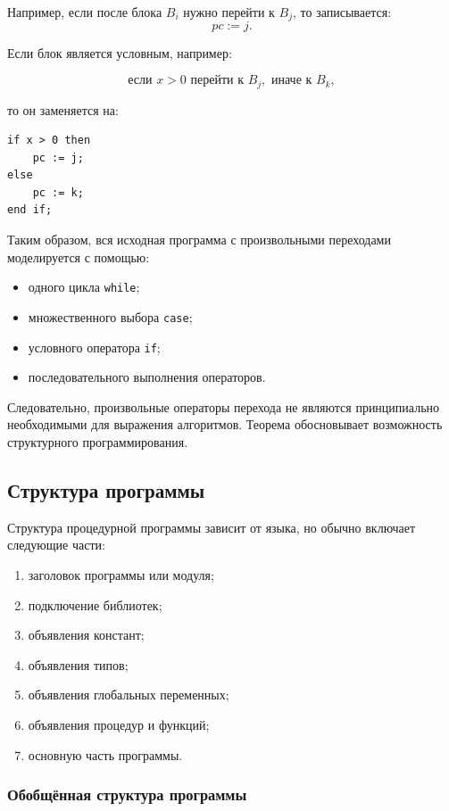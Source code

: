 \documentclass[12pt,a4paper]{article}
\begin{document}
Например, если после блока $B_i$ нужно перейти к $B_j$, то записывается:
\[
    pc := j.
\]

Если блок является условным, например:

\[
    \text{если } x > 0 \text{ перейти к } B_j, \text{ иначе к } B_k,
\]

то он заменяется на:

\begin{verbatim}
if x > 0 then
    pc := j;
else
    pc := k;
end if;
\end{verbatim}

Таким образом, вся исходная программа с произвольными переходами моделируется с помощью:
\begin{itemize}
    \item одного цикла \texttt{while};
    \item множественного выбора \texttt{case};
    \item условного оператора \texttt{if};
    \item последовательного выполнения операторов.
\end{itemize}

Следовательно, произвольные операторы перехода не являются принципиально необходимыми для выражения алгоритмов. Теорема обосновывает возможность структурного программирования.

\subsection{Структура программы}

Структура процедурной программы зависит от языка, но обычно включает следующие части:

\begin{enumerate}
    \item заголовок программы или модуля;
    \item подключение библиотек;
    \item объявления констант;
    \item объявления типов;
    \item объявления глобальных переменных;
    \item объявления процедур и функций;
    \item основную часть программы.
\end{enumerate}

\subsubsection{Обобщённая структура программы}
\end{document}
